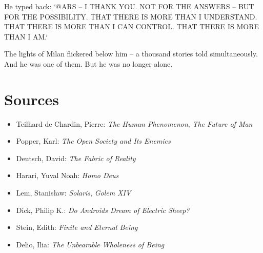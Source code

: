 \documentclass[
]{article}
\begin{document}
He typed back: `@ARS -- I THANK YOU. NOT FOR THE ANSWERS -- BUT FOR THE POSSIBILITY. THAT THERE IS MORE THAN I UNDERSTAND. THAT THERE IS MORE THAN I CAN CONTROL. THAT THERE IS MORE THAN I AM.`

The lights of Milan flickered below him -- a thousand stories told simultaneously. And he was one of them. But he was no longer alone.

\newpage

\section{Sources}

\begin{itemize}
\item Teilhard de Chardin, Pierre: \emph{The Human Phenomenon}, \emph{The Future of Man}
\item Popper, Karl: \emph{The Open Society and Its Enemies}
\item Deutsch, David: \emph{The Fabric of Reality}
\item Harari, Yuval Noah: \emph{Homo Deus}
\item Lem, Stanisław: \emph{Solaris}, \emph{Golem XIV}
\item Dick, Philip K.: \emph{Do Androids Dream of Electric Sheep?}
\item Stein, Edith: \emph{Finite and Eternal Being}
\item Delio, Ilia: \emph{The Unbearable Wholeness of Being}
\end{itemize}
\end{document}

